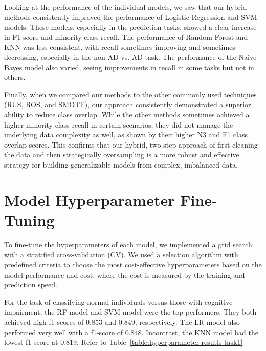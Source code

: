 Looking at the performance of the individual models, we saw that our hybrid methods consistently improved the performance of Logistic Regression and SVM models. These models, especially in the prediction tasks, showed a clear increase in F1-score and minority class recall. The performance of Random Forest and KNN was less consistent, with recall sometimes improving and sometimes decreasing, especially in the non-AD vs. AD task. The performance of the Naive Bayes model also varied, seeing improvements in recall in some tasks but not in others.

Finally, when we compared our methods to the other commonly used techniques (RUS, ROS, and SMOTE), our approach consistently demonstrated a superior ability to reduce class overlap. While the other methods sometimes achieved a higher minority class recall in certain scenarios, they did not manage the underlying data complexity as well, as shown by their higher N3 and F1 class overlap scores. This confirms that our hybrid, two-step approach of first cleaning the data and then strategically oversampling is a more robust and effective strategy for building generalizable models from complex, imbalanced data.

\section{Model Hyperparameter Fine-Tuning}

To fine-tune the hyperparameters of each model, we implemented a grid search with a stratified cross-validation (CV). We used a selection algorithm with predefined criteria to choose the most cost-effective hyperparameters based on the model performance and cost, where the cost is measured by the training and prediction speed.

For the task of classifying normal individuals versus those with cognitive impairment, the RF model and SVM model were the top performers. They both achieved high f1-scores of 0.853 and 0.849, respectively. The LR model also performed very well with a f1-score of 0.848. Incontrast, the KNN model had the lowest f1-score at 0.819. Refer to Table~\ref{table:hyperparameter-resutls-task1}


